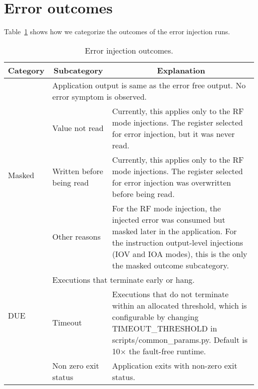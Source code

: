 \section{Error outcomes}

Table~\ref{tab:error-categories} shows how we categorize the outcomes of the error injection runs.

\begin{table}[tbp]
\caption{Error injection outcomes.}
\vspace*{-0.1in}
\label{tab:error-categories}
\centering
\begin{tabular}{|l|p{3cm}|p{10cm}|}
\hline

	\multicolumn{1}{|c|}{Category} & \multicolumn{1}{c|}{Subcategory} & \multicolumn{1}{c|}{Explanation} \\
	\hline 
	\hline

	\multirow{4}{*}{Masked} & \multicolumn{2}{|p{13cm}|}{Application output is same as the error free output. No error symptom is observed.} \\ 
	\cline{2-3}
							& Value not read & Currently, this applies only to the RF mode injections. The register selected for error injection, but it was never read. \\
	\cline{2-3}
							& Written before being read & Currently, this applies only to the RF mode injections. The register selected for error injection was overwritten before being read. \\ 
	\cline{2-3}
							& Other reasons & For the RF mode injection, the injected error was consumed but masked later in the application. For the instruction output-level injections (IOV and IOA modes), this is the only the masked outcome subcategory. \\
	\hline
	\hline

	\multirow{2}{*}{DUE} & \multicolumn{2}{|p{13cm}|}{Executions that terminate early or hang.} \\ 
	\cline{2-3}
							& Timeout & Executions that do not terminate within an allocated threshold, which is configurable by changing TIMEOUT\_THRESHOLD in scripts/common\_params.py. Default is 10$\times$ the fault-free runtime. \\ 
	\cline{2-3}
							& Non zero exit status & Application exits with non-zero exit status. \\ 
	\hline
	\hline



\end{tabular}
\end{table}
